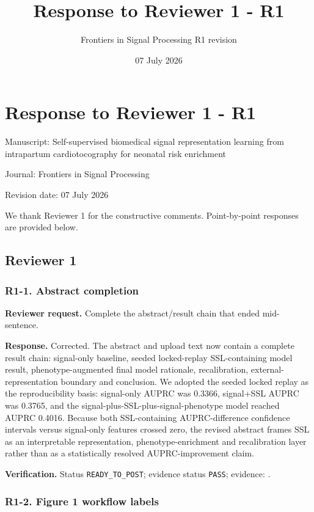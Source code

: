 \documentclass[11pt]{article}
\title{Response to Reviewer 1 - R1}
\author{Frontiers in Signal Processing R1 revision}
\date{07 July 2026}
\begin{document}
\maketitle

\section*{Response to Reviewer 1 - R1}

Manuscript: Self-supervised biomedical signal representation learning from intrapartum cardiotocography for neonatal risk enrichment


Journal: Frontiers in Signal Processing


Revision date: 07 July 2026


We thank Reviewer 1 for the constructive comments. Point-by-point responses are provided below.


\subsection*{Reviewer 1}

\subsubsection*{R1-1. Abstract completion}

\textbf{Reviewer request.} Complete the abstract/result chain that ended mid-sentence.


\textbf{Response.} Corrected. The abstract and upload text now contain a complete result chain: signal-only baseline, seeded locked-replay SSL-containing model result, phenotype-augmented final model rationale, recalibration, external-representation boundary and conclusion. We adopted the seeded locked replay as the reproducibility basis: signal-only AUPRC was 0.3366, signal+SSL AUPRC was 0.3765, and the signal-plus-SSL-plus-signal-phenotype model reached AUPRC 0.4016. Because both SSL-containing AUPRC-difference confidence intervals versus signal-only features crossed zero, the revised abstract frames SSL as an interpretable representation, phenotype-enrichment and recalibration layer rather than as a statistically resolved AUPRC-improvement claim.


\textbf{Verification.} Status \texttt{READY\_TO\_POST}; evidence status \texttt{PASS}; evidence: .


\subsubsection*{R1-2. Figure 1 workflow labels}
\end{document}

